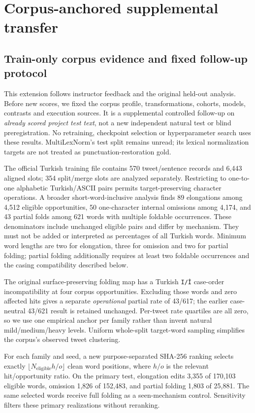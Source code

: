 \section{Corpus-anchored supplemental transfer}\label{sec:transfer}
\subsection{Train-only corpus evidence and fixed follow-up protocol}
This extension follows instructor feedback and the original held-out analysis.
Before new scores, we fixed the corpus profile, transformations, cohorts, models,
contrasts and execution sources. It is a supplemental controlled follow-up on
\emph{already scored project test text}, not a new independent natural test or
blind preregistration. No retraining, checkpoint selection or hyperparameter
search uses these results. MultiLexNorm's test split remains unread; its lexical
normalization targets are not treated as punctuation-restoration gold.

The official Turkish training file contains 570 tweet/sentence records and
6,443 aligned slots; 354 split/merge slots are analyzed separately. Restricting
to one-to-one alphabetic Turkish/ASCII pairs permits target-preserving character
operations. A broader short-word-inclusive analysis finds 89 elongations among
4,512 eligible opportunities, 50 one-character internal omissions among 4,174,
and 43 partial folds among 621 words with multiple foldable occurrences. These
denominators include unchanged eligible pairs and differ by mechanism. They
must not be added or interpreted as percentages of all Turkish words.
Minimum word lengths are two for elongation, three for omission and two for
partial folding; partial folding additionally requires at least two foldable
occurrences and the casing compatibility described below.

The original surface-preserving folding map has a Turkish \texttt{I/\.I}
case-order incompatibility at four corpus opportunities. Excluding those words
and zero affected hits gives a separate \emph{operational} partial rate of
43/617; the earlier case-neutral 43/621 result is retained unchanged. Per-tweet
rate quartiles are all zero, so we use one empirical anchor per family rather
than invent natural mild/medium/heavy levels. Uniform whole-split target-word
sampling simplifies the corpus's observed tweet clustering.

For each family and seed, a new purpose-separated SHA-256 ranking selects exactly
$\lfloor N_{\mathrm{eligible}} h/o\rfloor$ clean word positions, where $h/o$ is
the relevant hit/opportunity ratio. On the primary test, elongation edits 3,355
of 170,103 eligible words, omission 1,826 of 152,483, and partial folding 1,803
of 25,881. The same selected words receive full folding as a seen-mechanism
control. Sensitivity filters these primary realizations without reranking.

